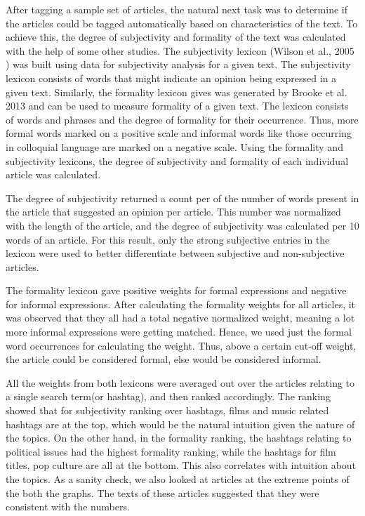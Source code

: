 \documentclass[11pt]{article}
\begin{document}
After tagging a sample set of articles, the natural next task was to determine if the articles could be tagged automatically based on characteristics of the text. To achieve this, the degree of subjectivity and formality of the text was calculated with the help of some other studies. The subjectivity lexicon (Wilson et al., 2005 \cite{wilson2005recognizing}) was built using data for subjectivity analysis for a given text. The subjectivity lexicon consists of words that might indicate an opinion being expressed in a given text. Similarly, the formality lexicon gives was generated by Brooke et al. 2013 \cite{brooke2013multi} and can be used to measure formality of a given text. The lexicon consists of words and phrases and the degree of formality for their occurrence. Thus, more formal words marked on a positive scale and informal words like those occurring in colloquial language are marked on a negative scale. Using the formality and subjectivity lexicons, the degree of subjectivity and formality of each individual article was calculated. 

The degree of subjectivity returned a count per of the number of words present in the article that suggested an opinion per article. This number was normalized with the length of the article, and the degree of subjectivity was calculated per 10 words of an article. For this result, only the strong subjective entries in the lexicon were used to better differentiate between subjective and non-subjective articles.

The formality lexicon gave positive weights for formal expressions and negative for informal expressions. After calculating the formality weights for all articles, it was observed that they all had a total negative normalized weight, meaning a lot more informal expressions were getting matched. Hence, we used just the formal word occurrences for calculating the weight. Thus, above a certain cut-off weight, the article could be considered formal, else would be considered informal.

All the weights from both lexicons were averaged out over the articles relating to a single search term(or hashtag), and then ranked accordingly. The ranking showed that for subjectivity ranking over hashtags, films and music related hashtags are at the top, which would be the natural intuition given the nature of the topics. On the other hand, in the formality ranking, the hashtags relating to political issues had the highest formality ranking, while the hashtags for film titles, pop culture are all at the bottom. This also correlates with intuition about the topics. As a sanity check, we also looked at articles at the extreme points of the both the graphs. The texts of these articles suggested that they were consistent with the numbers.
\end{document}
